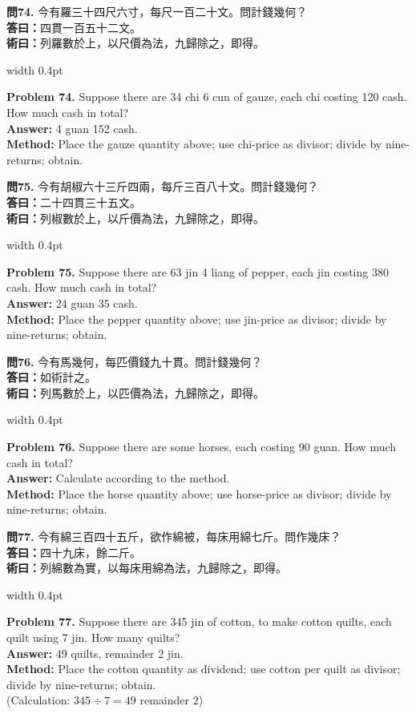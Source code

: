 \documentclass[10pt,a4paper]{article}
\newlength{\cnwidth}
\newlength{\enwidth}
\newcommand{\bilingual}[2]{%
  \noindent%
  \begin{minipage}[t]{\cnwidth}%
    #1%
  \end{minipage}%
  \hfill\vrule width 0.4pt\hfill%
  \begin{minipage}[t]{\enwidth}%
    #2%
  \end{minipage}%
  \par\smallskip%
}
\begin{document}
\bilingual{%
  \textbf{問74.}
  今有羅三十四尺六寸，每尺一百二十文。問計錢幾何？\\
  \textbf{答曰：}四貫一百五十二文。\\
  \textbf{術曰：}列羅數於上，以尺價為法，九歸除之，即得。
}{%
  \textbf{Problem 74.}
  Suppose there are 34 chi 6 cun of gauze, each chi costing 120 cash.
  How much cash in total?\\
  \textbf{Answer:} 4 guan 152 cash.\\
  \textbf{Method:} Place the gauze quantity above; use chi-price as divisor;
  divide by nine-returns; obtain.
}

\bilingual{%
  \textbf{問75.}
  今有胡椒六十三斤四兩，每斤三百八十文。問計錢幾何？\\
  \textbf{答曰：}二十四貫三十五文。\\
  \textbf{術曰：}列椒數於上，以斤價為法，九歸除之，即得。
}{%
  \textbf{Problem 75.}
  Suppose there are 63 jin 4 liang of pepper, each jin costing 380 cash.
  How much cash in total?\\
  \textbf{Answer:} 24 guan 35 cash.\\
  \textbf{Method:} Place the pepper quantity above; use jin-price as divisor;
  divide by nine-returns; obtain.
}

\bilingual{%
  \textbf{問76.}
  今有馬幾何，每匹價錢九十貫。問計錢幾何？\\
  \textbf{答曰：}如術計之。\\
  \textbf{術曰：}列馬數於上，以匹價為法，九歸除之，即得。
}{%
  \textbf{Problem 76.}
  Suppose there are some horses, each costing 90 guan.
  How much cash in total?\\
  \textbf{Answer:} Calculate according to the method.\\
  \textbf{Method:} Place the horse quantity above; use horse-price as divisor;
  divide by nine-returns; obtain.
}

\bilingual{%
  \textbf{問77.}
  今有綿三百四十五斤，欲作綿被，每床用綿七斤。問作幾床？\\
  \textbf{答曰：}四十九床，餘二斤。\\
  \textbf{術曰：}列綿數為實，以每床用綿為法，九歸除之，即得。
}{%
  \textbf{Problem 77.}
  Suppose there are 345 jin of cotton, to make cotton quilts,
  each quilt using 7 jin. How many quilts?\\
  \textbf{Answer:} 49 quilts, remainder 2 jin.\\
  \textbf{Method:} Place the cotton quantity as dividend; use cotton per quilt as
  divisor; divide by nine-returns; obtain.\\
  (Calculation: $345 \div 7 = 49$ remainder $2$)
}
\end{document}
